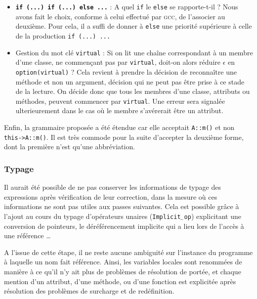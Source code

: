 \documentclass[11pt, a4paper]{article}
\newcommand{\prog}[1]{{\tt#1}}
\newcommand{\underscore}{$\_\,$}
\begin{document}
\medskip
\begin{itemize}
\item \textbf{\prog{if (...) if (...) else ...}} :\newline
	A quel \prog{if} le \prog{else} se rapporte-t-il ? Nous avons fait le choix, conforme
    à celui effectué par \textsc{gcc}, de l'associer au deuxième. Pour cela, il a
    suffi de donner à \prog{else} une priorité supérieure à celle de la production
    \prog{if (...) ...}
    \smallskip
\item Gestion du mot clé \prog{virtual} : \newline
	Si on lit une chaîne correspondant à un membre 
    d'une classe, ne commençant pas par \prog{virtual}, doit-on alors réduire $\epsilon$ en 
    \prog{option(virtual)} ?  Cela revient à prendre la décision de reconnaître une
    méthode et non un argument, décision qui ne peut pas être prise à ce stade
    de la lecture.  \newline
    On décide donc que tous les membres d'une classe, attributs ou méthodes, 
    peuvent commencer par \prog{virtual}. Une erreur sera signalée ulterieurement dans
    le cas où le membre s'avérerait être un attribut.
   
	
\end{itemize}

\medskip
Enfin, la grammaire proposée a été étendue car elle acceptait \prog{A::m()} et non \prog{this->A::m()}. Il est très commode pour la suite d'accepter la deuxième forme, dont la première n'est qu'une abbréviation.

\subsubsection{Typage}

Il aurait été possible de ne pas conserver les informations de typage des expressions après vérification de leur correction, dans la mesure où ces informations ne sont pas utiles aux passes suivantes. Cela est possible grâce à l'ajout au cours du typage d'opérateurs unaires (\prog{Implicit\underscore{}op}) explicitant une conversion de pointeurs, le déréférencement implicite qui a lieu lors de l'accès à une référence \dots

A l'issue de cette étape, il ne reste aucune ambiguité sur l'instance du programme à laquelle un nom fait référence. Ainsi, les variables locales sont renommées de manière à ce qu'il n'y ait plus de problèmes de résolution de portée, et chaque mention d'un attribut, d'une méthode, ou d'une fonction est explicitée après résolution des problèmes de surcharge et de redéfinition.
\end{document}
